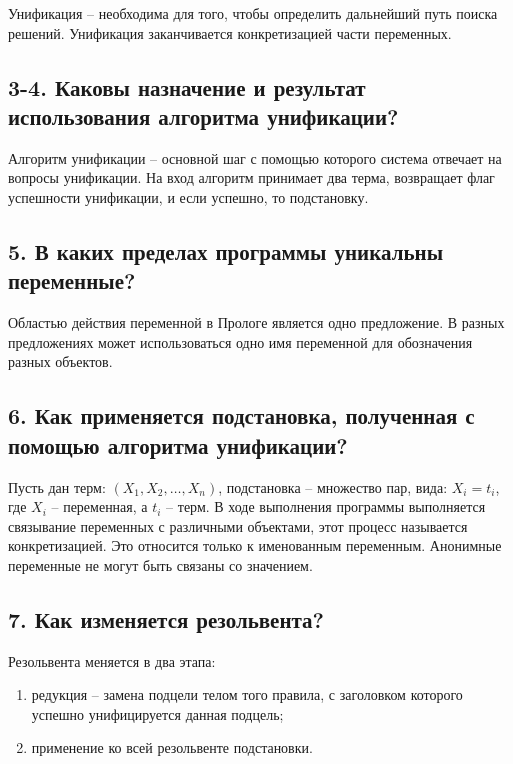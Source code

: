 Унификация – необходима для того, чтобы определить дальнейший путь поиска решений. Унификация заканчивается конкретизацией части переменных.

\subsection*{3-4. Каковы назначение и результат использования алгоритма унификации?}

Алгоритм унификации -- основной шаг с помощью которого система отвечает на вопросы унификации. На вход алгоритм принимает два терма, возвращает флаг успешности унификации, и если успешно, то подстановку.

\subsection*{5. В каких пределах программы уникальны переменные?}

Областью действия переменной в Прологе является одно предложение. В разных предложениях может использоваться одно имя переменной для обозначения разных объектов.

\subsection*{6. Как применяется подстановка, полученная с помощью алгоритма унификации?}

Пусть дан терм: $(X_1, X_2,\dots, X_n)$, подстановка -- множество пар, вида: ${X_i = t_i}$, где $X_i$ -- переменная, а $t_i$ -- терм. В ходе выполнения программы выполняется связывание переменных с различными объектами, этот процесс называется конкретизацией. Это относится только к именованным переменным. Анонимные переменные не могут быть связаны со значением.

\subsection*{7. Как изменяется резольвента?}

Резольвента меняется в два этапа:

\begin{enumerate}
	\item редукция -- замена подцели телом того правила, с заголовком которого успешно унифицируется данная подцель;
	
	\item применение ко всей резольвенте подстановки.
\end{enumerate}

